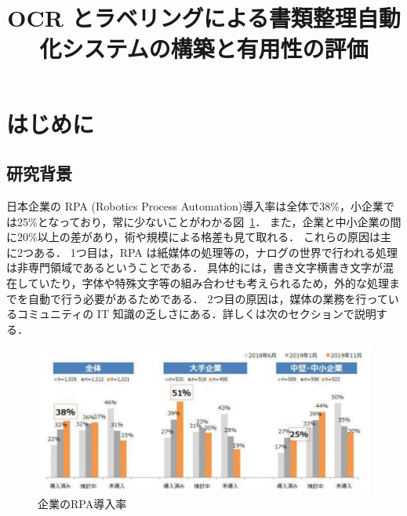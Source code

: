 \documentclass[a4j, 10pt, twocolumn]{ujarticle}
\begin{document}
\title{OCR とラベリングによる書類整理自動化システムの構築と有用性の評価}{}



\Email{}

\Keyword{}
\MKTITLE{}

\renewcommand{\baselinestretch}{1.0}
\setlength{\baselineskip}{1.5zh}
\renewcommand{\textfraction}{0.1}
\renewcommand{\floatsep}{1pt}
\renewcommand{\intextsep}{4pt}
\renewcommand{\textfloatsep}{4pt}

\vspace{-20mm}

\section{はじめに}
\subsection{研究背景}

日本企業の RPA (Robotics Process Automation)導入率は全体で38\%，小企業では25\%となっており，常に少ないことがわかる図~\ref{fig:rpa_rate}．
また，企業と中小企業の間に20\%以上の差があり，術や規模による格差も見て取れる． これらの原因は主に2つある．
1つ目は，RPA は紙媒体の処理等の，ナログの世界で行われる処理は非専門領域であるということである．
具体的には，書き文字横書き文字が混在していたり，字体や特殊文字等の組み合わせも考えられるため，外的な処理までを自動で行う必要があるためである．
2つ目の原因は，媒体の業務を行っているコミュニティの IT 知識の乏しさにある．詳しくは次のセクションで説明する．

\begin{figure}[htbp]
  \includegraphics[scale = 0.3]{img/rpa_rate.pdf}
  \caption{企業のRPA導入率}
  \label{fig:rpa_rate}
\end{figure}
\end{document}
